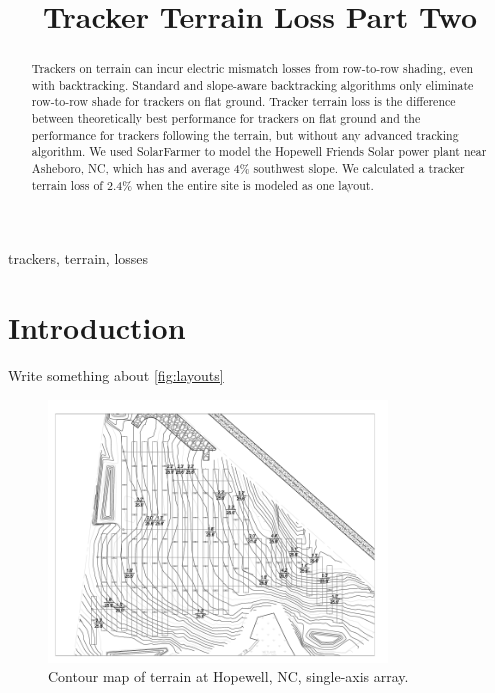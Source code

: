 \documentclass[conference]{IEEEtran}
\begin{document}
\title{Tracker Terrain Loss Part Two}

\author{
	}

\maketitle

\begin{abstract}
Trackers on terrain can incur electric mismatch losses from row-to-row shading, even with backtracking. Standard and slope-aware backtracking algorithms only eliminate row-to-row shade for trackers on flat ground. Tracker terrain loss is the difference between theoretically best performance for trackers on flat ground and the performance for trackers following the terrain, but without any advanced tracking algorithm. We used SolarFarmer to model the Hopewell Friends Solar power plant near Asheboro, NC, which has and average 4\% southwest slope. We calculated a tracker terrain loss of 2.4\% when the entire site is modeled as one layout.
\end{abstract}

\begin{IEEEkeywords}
trackers, terrain, losses
\end{IEEEkeywords}

\section{Introduction}
Write something about \ref{fig:layouts}

\begin{figure}[htbp]
\centerline{\includegraphics[width=9cm]{Hopewell_Civil_Base.png}}
\caption{Contour map of terrain at Hopewell, NC, single-axis array.}
\label{fig:hopewell_contour_map}
\end{figure}
\end{document}
